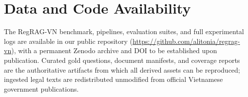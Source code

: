 \documentclass[conference,a4paper]{IEEEtran}
\begin{document}
\section*{Data and Code Availability}
The RegRAG-VN benchmark, pipelines, evaluation suites, and full experimental logs are available in our public repository (\url{https://github.com/alitonia/regrag-vn}), with a permanent Zenodo archive and DOI to be established upon publication. Curated gold questions, document manifests, and coverage reports are the authoritative artifacts from which all derived assets can be reproduced; ingested legal texts are redistributed unmodified from official Vietnamese government publications.



\end{document}
